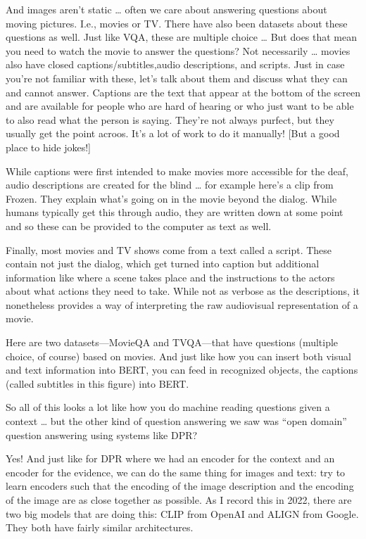 And images aren’t static … often we care about answering questions about moving pictures.  I.e., movies or TV.  There have also been datasets about these questions as well.  Just like VQA, these are multiple choice … But does that mean you need to watch the movie to answer the questions?  Not necessarily … movies also have closed captions/subtitles,audio descriptions, and scripts.  Just in case you’re not familiar with these, let’s talk about them and discuss what they can and cannot answer.
Captions are the text that appear at the bottom of the screen and are available for people who are hard of hearing or who just want to be able to also read what the person is saying.  They’re not always purfect, but they usually get the point acroos.  It’s a lot of work to do it manually!  [But a good place to hide jokes!]

While captions were first intended to make movies more accessible for the deaf, audio descriptions are created for the blind … for example here’s a clip from Frozen.  They explain what’s going on in the movie beyond the dialog.  While humans typically get this through audio, they are written down at some point and so these can be provided to the computer as text as well.

Finally, most movies and TV shows come from a text called a script.  These contain not just the dialog, which get turned into caption but additional information like where a scene takes place and the instructions to the actors about what actions they need to take.  While not as verbose as the descriptions, it nonetheless provides a way of interpreting the raw audiovisual representation of a movie.

Here are two datasets—MovieQA and TVQA—that have questions (multiple choice, of course) based on movies.  And just like how you can insert both visual and text information into BERT, you can feed in recognized objects, the captions (called subtitles in this figure) into BERT.

So all of this looks a lot like how you do machine reading questions given a context … but the other kind of question answering we saw was “open domain” question answering using systems like DPR?  

Yes!  And just like for DPR where we had an encoder for the context and an encoder for the evidence, we can do the same thing for images and text: try to learn encoders such that the encoding of the image description and the encoding of the image are as close together as possible.  As I record this in 2022, there are two big models that are doing this: CLIP from OpenAI and ALIGN from Google.  They both have fairly similar architectures.

